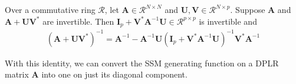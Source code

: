 \begin{proposition}
  \label{prop:woodbury}
  Over a commutative ring $\mathcal{R}$, let $\bm{A} \in \mathcal{R}^{N \times N}$ and $\bm{U},\bm{V} \in \mathcal{R}^{N \times p}$. Suppose $\bm{A}$ and $\bm{A}+\bm{U}\bm{V}^*$ are invertible. Then $\bm{I}_p + \bm{V}^*\bm{A}^{-1}\bm{U} \in \mathcal{R}^{p \times p}$ is invertible and
  \begin{align*}
    (\bm{A} + \bm{U}\bm{V}^*)^{-1} = \bm{A}^{-1} - \bm{A}^{-1}\bm{U}(\bm{I}_p + \bm{V}^*\bm{A}^{-1}\bm{U})^{-1}\bm{V}^*\bm{A}^{-1}
  \end{align*}
\end{proposition}

With this identity, we can convert the SSM generating function on a DPLR matrix \( \bm{A} \) into one on just its diagonal component.

